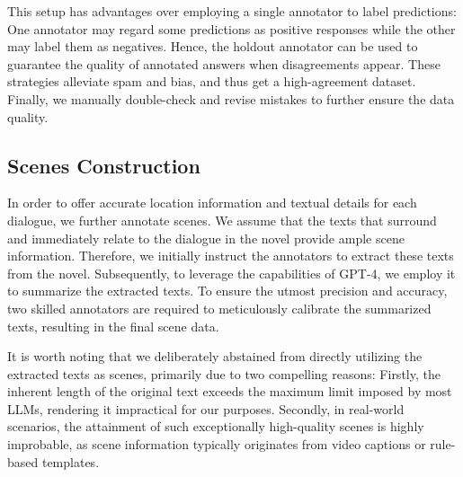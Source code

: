 \documentclass[11pt]{article}
\begin{document}
This setup has advantages over employing a single annotator to label predictions: One annotator may regard some predictions as positive responses while the other may label them as negatives. Hence, the holdout annotator can be used to guarantee the quality of annotated answers when disagreements appear. These strategies alleviate spam and bias, and thus get a high-agreement dataset. Finally, we manually double-check and revise mistakes to further ensure the data quality.
 
 
 


  







\subsection{Scenes Construction}
\label{scene}

In order to offer accurate location information and textual details for each dialogue, we further annotate scenes. 
We assume that the texts that surround and immediately relate to the dialogue
in the novel provide ample scene information. 
Therefore, we initially instruct the annotators to extract these texts from the novel.
Subsequently, to leverage the capabilities of GPT-4, we employ it to summarize the extracted texts. To ensure the utmost precision and accuracy,  two skilled annotators are required to meticulously calibrate the summarized texts, resulting in the final scene data.

 It is worth noting that we deliberately abstained from directly utilizing the extracted texts as scenes, primarily due to two compelling reasons: Firstly, the inherent length of the original text exceeds the maximum limit imposed by most LLMs, rendering it impractical for our purposes. Secondly, in real-world scenarios, the attainment of such exceptionally high-quality scenes is highly improbable, as scene information typically originates from video captions or rule-based templates.
\end{document}
